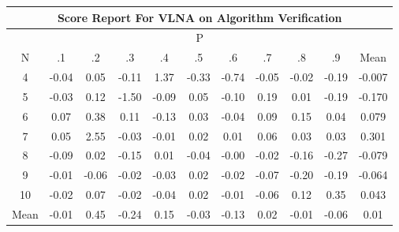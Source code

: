 \documentclass[11pt,a4paper]{report}
\begin{document}
\begin{longtable}{ | c || c | c | c | c | c | c | c | c | c || c |}
\hline
\multicolumn{11}{|c|}{ Score Report For VLNA on Algorithm Verification} \\
\hline
\multicolumn{11}{|c|}{ P } \\
\hline
N & .1 & .2 & .3 & .4 & .5 & .6 & .7 & .8 & .9 & Mean\\
 \hline
 \hline
 \endhead
  4 &  \cellcolor[HTML]{FFFFFF} -0.04 &  \cellcolor[HTML]{FFFFFF} 0.05 &  \cellcolor[HTML]{FFFFFF} -0.11 &  \cellcolor[HTML]{DFDFFF} 1.37 &  \cellcolor[HTML]{FFF7F7} -0.33 &  \cellcolor[HTML]{FFEFEF} -0.74 &  \cellcolor[HTML]{FFFFFF} -0.05 &  \cellcolor[HTML]{FFFFFF} -0.02 &  \cellcolor[HTML]{FFF7F7} -0.19 & -0.007 \\
  5 &  \cellcolor[HTML]{FFFFFF} -0.03 &  \cellcolor[HTML]{FFFFFF} 0.12 &  \cellcolor[HTML]{FFD7D7} -1.50 &  \cellcolor[HTML]{FFFFFF} -0.09 &  \cellcolor[HTML]{FFFFFF} 0.05 &  \cellcolor[HTML]{FFFFFF} -0.10 &  \cellcolor[HTML]{F7F7FF} 0.19 &  \cellcolor[HTML]{FFFFFF} 0.01 &  \cellcolor[HTML]{FFF7F7} -0.19 & -0.170 \\
  6 &  \cellcolor[HTML]{FFFFFF} 0.07 &  \cellcolor[HTML]{F7F7FF} 0.38 &  \cellcolor[HTML]{FFFFFF} 0.11 &  \cellcolor[HTML]{FFFFFF} -0.13 &  \cellcolor[HTML]{FFFFFF} 0.03 &  \cellcolor[HTML]{FFFFFF} -0.04 &  \cellcolor[HTML]{FFFFFF} 0.09 &  \cellcolor[HTML]{FFFFFF} 0.15 &  \cellcolor[HTML]{FFFFFF} 0.04 & 0.079 \\
  7 &  \cellcolor[HTML]{FFFFFF} 0.05 &  \cellcolor[HTML]{BFBFFF} 2.55 &  \cellcolor[HTML]{FFFFFF} -0.03 &  \cellcolor[HTML]{FFFFFF} -0.01 &  \cellcolor[HTML]{FFFFFF} 0.02 &  \cellcolor[HTML]{FFFFFF} 0.01 &  \cellcolor[HTML]{FFFFFF} 0.06 &  \cellcolor[HTML]{FFFFFF} 0.03 &  \cellcolor[HTML]{FFFFFF} 0.03 & 0.301 \\
  8 &  \cellcolor[HTML]{FFFFFF} -0.09 &  \cellcolor[HTML]{FFFFFF} 0.02 &  \cellcolor[HTML]{FFFFFF} -0.15 &  \cellcolor[HTML]{FFFFFF} 0.01 &  \cellcolor[HTML]{FFFFFF} -0.04 &  \cellcolor[HTML]{FFFFFF} -0.00 &  \cellcolor[HTML]{FFFFFF} -0.02 &  \cellcolor[HTML]{FFFFFF} -0.16 &  \cellcolor[HTML]{FFF7F7} -0.27 & -0.079 \\
  9 &  \cellcolor[HTML]{FFFFFF} -0.01 &  \cellcolor[HTML]{FFFFFF} -0.06 &  \cellcolor[HTML]{FFFFFF} -0.02 &  \cellcolor[HTML]{FFFFFF} -0.03 &  \cellcolor[HTML]{FFFFFF} 0.02 &  \cellcolor[HTML]{FFFFFF} -0.02 &  \cellcolor[HTML]{FFFFFF} -0.07 &  \cellcolor[HTML]{FFF7F7} -0.20 &  \cellcolor[HTML]{FFF7F7} -0.19 & -0.064 \\
  10 &  \cellcolor[HTML]{FFFFFF} -0.02 &  \cellcolor[HTML]{FFFFFF} 0.07 &  \cellcolor[HTML]{FFFFFF} -0.02 &  \cellcolor[HTML]{FFFFFF} -0.04 &  \cellcolor[HTML]{FFFFFF} 0.02 &  \cellcolor[HTML]{FFFFFF} -0.01 &  \cellcolor[HTML]{FFFFFF} -0.06 &  \cellcolor[HTML]{FFFFFF} 0.12 &  \cellcolor[HTML]{F7F7FF} 0.35 & 0.043 \\
 \hline
 \hline
Mean &  \cellcolor[HTML]{FFFFFF} -0.01 &  \cellcolor[HTML]{F7F7FF} 0.45 &  \cellcolor[HTML]{FFF7F7} -0.24 &  \cellcolor[HTML]{FFFFFF} 0.15 &  \cellcolor[HTML]{FFFFFF} -0.03 &  \cellcolor[HTML]{FFFFFF} -0.13 &  \cellcolor[HTML]{FFFFFF} 0.02 &  \cellcolor[HTML]{FFFFFF} -0.01 &  \cellcolor[HTML]{FFFFFF} -0.06 &  \cellcolor[HTML]{FFFFFF} 0.01
\end{longtable}
\end{document}
